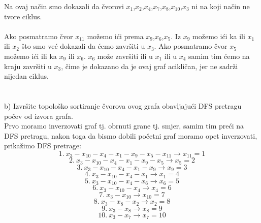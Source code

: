 \documentclass[12pt]{article}
\begin{document}
\begin{enumerate}
Na ovaj način smo dokazali da čvorovi $x_1$,$x_2$,$x_4$,$x_7$,$x_8$,$x_{10}$,$x_3$ ni na koji način ne tvore ciklus.\\
\\
Ako posmatramo čvor $x_{11}$ možemo ići prema $x_9$,$x_6$,$x_5$. Iz $x_9$ možemo ići ka ili $x_1$ ili $x_2$ što smo već dokazali da ćemo završiti u $x_3$. Ako posmatramo čvor $x_5$ možemo ići ili ka $x_9$ ili $x_6$. $x_6$ može završiti ili u $x_1$ ili u $x_4$ samim tim ćemo na kraju završiti u $x_3$, čime je dokazano da je ovaj graf acikličan, jer ne sadrži nijedan ciklus.
\\
\\
\\
b) Izvršite topološko sortiranje čvorova ovog grafa obavljajući DFS pretragu počev od izvora grafa.
\\
Prvo moramo inverzovati graf tj. obrnuti grane tj. smjer, samim tim preći na DFS pretragu, nakon toga da bismo dobili početni graf moramo opet inverzovati, prikažimo DFS pretrage:
\begin{equation*}
    1.~x_3 - x_{10} - x_4 - x_1 - x_9 - x_5 - x_{11} \rightarrow x_{11} = 1
\end{equation*}
\begin{equation*}
    2.~x_3 - x_{10} - x_4 - x_1 - x_9 - x_5 \rightarrow x_5 = 2
\end{equation*}
\begin{equation*}
    3.~x_3 - x_{10} - x_4 - x_1 - x_9 \rightarrow x_9 = 3
\end{equation*}
\begin{equation*}
    4.~x_3 - x_{10} - x_4 - x_1 \rightarrow x_1 = 4
\end{equation*}
\begin{equation*}
    5.~x_3 - x_{10} - x_4 - x_6 \rightarrow x_6 = 5
\end{equation*}
\begin{equation*}
    6.~x_3 - x_{10} - x_4 \rightarrow x_{4} = 6
\end{equation*}
\begin{equation*}
    7.~x_3 - x_{10}  \rightarrow x_{10} = 7
\end{equation*}
\begin{equation*}
    8.~x_3 - x_8 - x_2 \rightarrow x_2 = 8
\end{equation*}
\begin{equation*}
    9.~x_3 - x_8 \rightarrow x_8 = 9
\end{equation*}
\begin{equation*}
    10.~x_3 - x_7 \rightarrow x_7 = 10

\end{equation*}
\end{enumerate}
\end{document}
